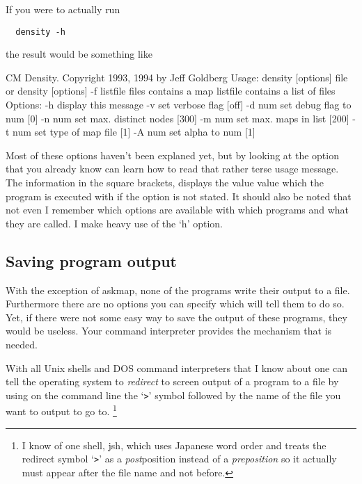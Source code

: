 \documentclass[%
	11pt,
        a4paper,
        twoside]{workrep}
\newcommand*{\prg}[1]{\textsf{#1}}		%
\newcommand*{\nt}[1]{\textit{#1}}		%
\begin{document}
If you were to actually run
\begin{verbatim}
  density -h
\end{verbatim}
the result would be something like
\begin{verbatimtab}
CM Density. Copyright 1993, 1994 by Jeff Goldberg
Usage: density [options] file
   or  density [options] -f listfile
	files contains a map
	listfile contains a list of files
	Options:
		-h	display this message
		-v	set verbose flag [off]
		-d num	set debug flag to num [0]
		-n num	set max. distinct nodes [300]
		-m num	set max. maps in list [200]
		-t num	set type of map file [1]
		-A num	set alpha to num [1]
\end{verbatimtab}

Most of these options haven't been explaned yet, but by looking at
the option that you already know can learn how to read that rather
terse usage message.  The information in the square brackets,
displays the value value which the program is executed with if the
option is not stated.  It should also be noted that not even I
remember which options are available with which programs and what
they are called.  I make heavy use of the `h' option.

\subsection{Saving program output}
With the exception of \prg{askmap}, none of the programs write their
output to a file.  Furthermore there are no options you can specify
which will tell them to do so.  Yet, if there were not some easy way
to save the output of these programs, they would be useless.  Your
command interpreter provides the mechanism that is needed.

With all Unix shells and DOS command interpreters that I know about
one can tell the operating system to \nt{redirect} to screen output
of a program to a file by using on the command line the `\texttt{>}'
symbol followed by the name of the file you want to output to go to.%
\footnote{I know of one shell, \prg{jsh}, which uses Japanese word
order and treats the redirect symbol `\texttt{>}' as a \emph{post}position
instead of a \emph{preposition} so it actually must appear after the
file name and not before.}
\end{document}
